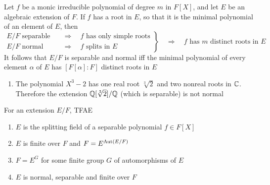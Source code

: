 \documentclass[11pt]{article}
\begin{document}
Let \(f\) be a monic irreducible polynomial of degree \(m\) in \(F[X]\), and let \(E\) be an
algebraic extension of \(F\). If \(f\) has a root in \(E\), so that it is the minimal polynomial
of an element of \(E\), then
\begin{equation*}
\left.
\begin{aligned}
E/F\text{ separable}&\quad\Rightarrow\quad f\text{ has only simple roots}\\
E/F\text{ normal}&\quad\Rightarrow\quad f\text{ splits in }E
\end{aligned}
\right\}\quad\Rightarrow\quad f\text{ has $m$ distinct roots in }E
\end{equation*}
It follows that \(E/F\) is separable and normal iff the minimal polynomial of every element
\(\alpha\) of \(E\) has \([F[\alpha]:F]\) distinct roots in \(E\)

\begin{examplle}[]
\begin{enumerate}
\item The polynomial \(X^3-2\) has one real root \(\sqrt[3]{2}\) and two nonreal roots in \(\mathbb{C}\).
Therefore the extension \(\mathbb{Q}[\sqrt[3]{2}]/\mathbb{Q}\) (which is separable) is not normal
\end{enumerate}
\end{examplle}

\begin{theorem}[]
\label{3.9}
For an extension \(E/F\), TFAE
\begin{enumerate}
\item \(E\) is the splitting field of a separable polynomial \(f\in F[X]\)
\item \(E\) is finite over \(F\) and \(F=E^{\operatorname{\text{Aut}}(E/F)}\)
\item \(F=E^G\) for some finite group \(G\) of automorphisms of \(E\)
\item \(E\) is normal, separable and finite over \(F\)
\end{enumerate}
\end{theorem}
\end{document}
